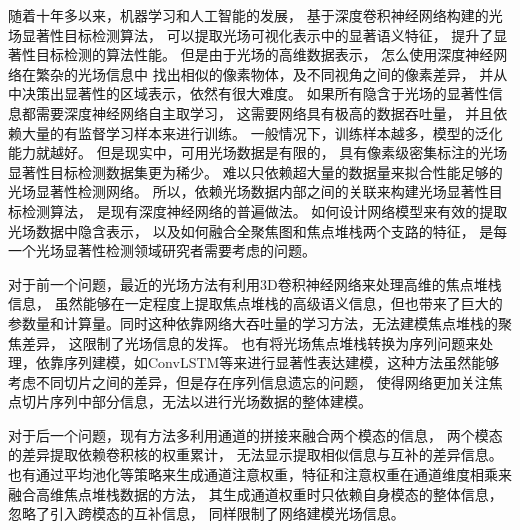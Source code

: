 




随着十年多以来，机器学习和人工智能的发展，
基于深度卷积神经网络构建的光场显著性目标检测算法，
可以提取光场可视化表示中的显著语义特征，
提升了显著性目标检测的算法性能。
但是由于光场的高维数据表示，
怎么使用深度神经网络在繁杂的光场信息中
找出相似的像素物体，及不同视角之间的像素差异，
并从中决策出显著性的区域表示，依然有很大难度。
如果所有隐含于光场的显著性信息都需要深度神经网络自主取学习，
这需要网络具有极高的数据吞吐量，
并且依赖大量的有监督学习样本来进行训练。
一般情况下，训练样本越多，模型的泛化能力就越好。
但是现实中，可用光场数据是有限的，
具有像素级密集标注的光场显著性目标检测数据集更为稀少。
难以只依赖超大量的数据量来拟合性能足够的光场显著性检测网络。
所以，依赖光场数据内部之间的关联来构建光场显著性目标检测算法，
是现有深度神经网络的普遍做法。
如何设计网络模型来有效的提取光场数据中隐含表示，
以及如何融合全聚焦图和焦点堆栈两个支路的特征，
是每一个光场显著性检测领域研究者需要考虑的问题。






对于前一个问题，最近的光场方法有利用3D卷积神经网络来处理高维的焦点堆栈信息，
虽然能够在一定程度上提取焦点堆栈的高级语义信息，但也带来了巨大的参数量和计算量。同时这种依靠网络大吞吐量的学习方法，无法建模焦点堆栈的聚焦差异，
这限制了光场信息的发挥。
也有将光场焦点堆栈转换为序列问题来处理，依靠序列建模，如ConvLSTM等来进行显著性表达建模，这种方法虽然能够考虑不同切片之间的差异，但是存在序列信息遗忘的问题，
使得网络更加关注焦点切片序列中部分信息，无法以进行光场数据的整体建模。



对于后一个问题，现有方法多利用通道的拼接来融合两个模态的信息，
两个模态的差异提取依赖卷积核的权重累计，
无法显示提取相似信息与互补的差异信息。
也有通过平均池化等策略来生成通道注意权重，特征和注意权重在通道维度相乘来融合高维焦点堆栈数据的方法，
其生成通道权重时只依赖自身模态的整体信息，忽略了引入跨模态的互补信息，
同样限制了网络建模光场信息。







